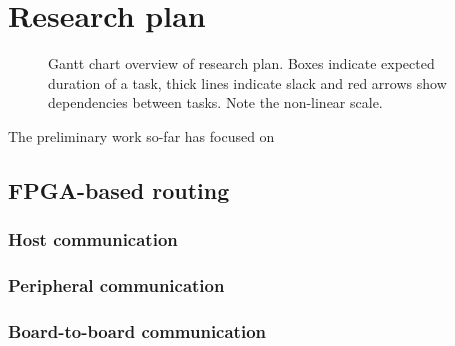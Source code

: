 \chapter{Research plan}
	\label{sec:research-plan}
	
	
	\begin{figure}
		\center
		
		\caption[Gantt chart overview of research plan.]{Gantt chart overview of
		research plan. Boxes indicate expected duration of a task, thick lines
		indicate slack and red arrows show dependencies between tasks. Note the
		non-linear scale.}
		\label{fig:plan-gantt}
	\end{figure}
	
	The preliminary work so-far has focused on 
	
	\section{FPGA-based routing}
		
		
		\subsection{Host communication}
			
		
		\subsection{Peripheral communication}
			
		
		\subsection{Board-to-board communication}
			
	
